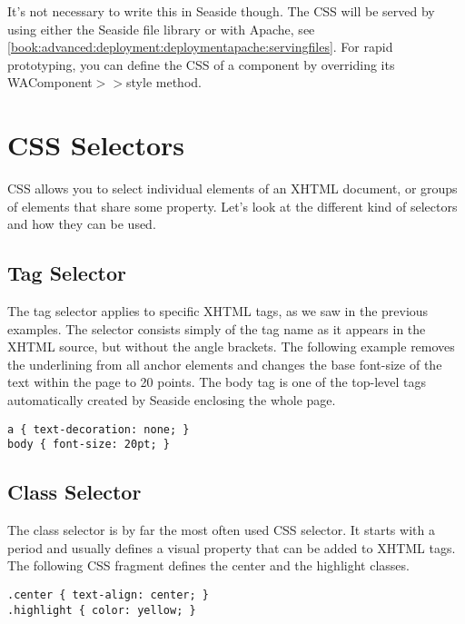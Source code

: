 \documentclass[a4paper,10pt,twoside]{book}
\newcommand{\ct}[1]{{\small\ttfamily\textup{#1}}}
\begin{document}
It's not necessary to write this in Seaside though. The CSS will be served by using either the Seaside file library or with Apache, see \autoref{book:advanced:deployment:deploymentapache:servingfiles}. For rapid prototyping, you can define the CSS of a component by overriding its  \ct{WAComponent$>$$>$style} method.

\section{CSS Selectors}
\label{book:fundamentals:css:selectors}

CSS allows you to select individual elements of an XHTML document, or groups of elements that share some property. Let's look at the different kind of selectors and how they can be used.

\subsection{Tag Selector}
\label{book:fundamentals:css:selectors:tag}

The tag selector applies to specific XHTML tags, as we saw in the previous examples. The selector consists simply of the tag name as it appears in the XHTML source, but without the angle brackets. The following example removes the underlining from all anchor elements and changes the base font-size of the text within the page to 20 points. The \ct{body} tag is one of the top-level tags automatically created by Seaside enclosing the whole page.

\begin{lstlisting}
a { text-decoration: none; }
body { font-size: 20pt; }
\end{lstlisting}

\subsection{Class Selector}
\label{book:fundamentals:css:selectors:class}

The class selector is by far the most often used CSS selector. It starts with a period and usually defines a visual property that can be added to XHTML tags. The following CSS fragment defines the \ct{center} and the \ct{highlight} classes.

\begin{lstlisting}
.center { text-align: center; }
.highlight { color: yellow; }
\end{lstlisting}
\end{document}
